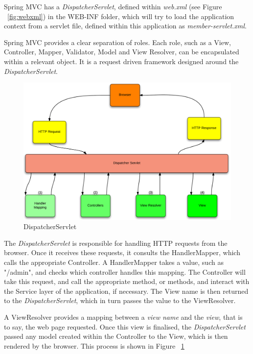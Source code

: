 Spring MVC has a \textit{DispatcherServlet}, defined within \textit{web.xml} (see Figure ~\ref{fig:webxml}) in the WEB-INF folder, which will try to load the application context from a servlet file, defined within this application as \textit{member-servlet.xml}. 

Spring MVC provides a clear separation of roles. Each role, such as a View, Controller, Mapper, Validator, Model and View Resolver, can be encapsulated within a relevant object. It is a request driven framework designed around the \textit{DispatcherServlet}. 

\begin{figure}[H]
\begin{center}
\includegraphics[width=14cm]{dispatchservlet.png}
\end{center}
\caption{DispatcherServlet}
\label{fig:dispatcherflow}
\end{figure}

The \textit{DispatcherServlet} is responsible for handling HTTP requests from the browser. Once it receives these requests, it consults the HandlerMapper, which calls the appropriate Controller. A HandlerMapper takes a value, such as "/admin", and checks which controller handles this mapping. The Controller will take this request, and call the appropriate method, or methods, and interact with the Service layer of the application, if necessary. The View name is then returned to the \textit{DispatcherServlet}, which in turn passes the value to the ViewResolver. 

A ViewResolver provides a mapping between a \textit{view name} and the \textit{view}, that is to say, the web page requested. Once this view is finalised, the \textit{DispatcherServlet} passed any model created within the Controller to the View, which is then rendered by the browser. This process is shown in Figure ~\ref{fig:dispatcherflow}



